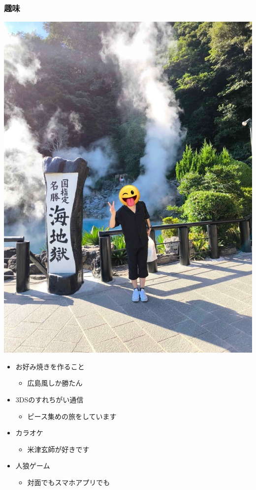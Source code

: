 \documentclass[aspectratio=169, dvipdfmx, 11pt]{beamer} %
\begin{document}
\begin{frame}
    \frametitle{趣味}
    \begin{minipage}[t]{0.4\textwidth} %
      \vspace{0pt}
      \centering
      \includegraphics[width=0.8\linewidth]{fig/umi.JPG}\\
    \end{minipage}%
    \begin{minipage}[t]{0.6\textwidth}
      \vspace{0pt}
      \hspace{0.5cm} %
      \LARGE
      \begin{itemize}
        \item お好み焼きを作ること
        \begin{itemize}
            \item {\Large 広島風しか勝たん}
        \end{itemize}
        \item 3DSのすれちがい通信
        \begin{itemize}
            \item {\Large ピース集めの旅をしています}
        \end{itemize}
        \item カラオケ
        \begin{itemize}
            \item {\Large 米津玄師が好きです}
        \end{itemize}
        \item 人狼ゲーム
        \begin{itemize}
            \item {\Large 対面でもスマホアプリでも}
        \end{itemize}
    \end{itemize}
    \end{minipage}
\end{frame}
\end{document}
